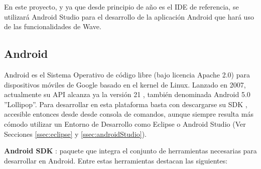 	En este proyecto, y ya que desde principio de año es el IDE de referencia, se utilizará Android Studio para el desarrollo de la aplicación Android que hará uso de las funcionalidades de Wave.
    
    \subsection{Android}\label{ssec:android}
    
	Android \cite{ref:android_platform} es el Sistema Operativo de código libre (bajo licencia Apache 2.0) para dispositivos móviles de Google basado en el kernel de Linux. Lanzado en 2007, actualmente su API alcanza ya la versión 21 \cite{ref:android_api21}, también denominada Android 5.0 ''Lollipop''. Para desarrollar en esta plataforma basta con descargarse su SDK \cite{ref:android_sdk}, accesible entonces desde desde consola de comandos, aunque siempre resulta más cómodo utilizar un Entorno de Desarrollo como Eclipse o Android Studio (Ver Secciones \ref{ssec:eclipse} y \ref{ssec:androidStudio}).
	
	\textbf{Android SDK} \cite{ref:android_sdk}: paquete que integra el conjunto de herramientas necesarias para desarrollar en Android.  Entre estas herramientas destacan las siguientes:
    
